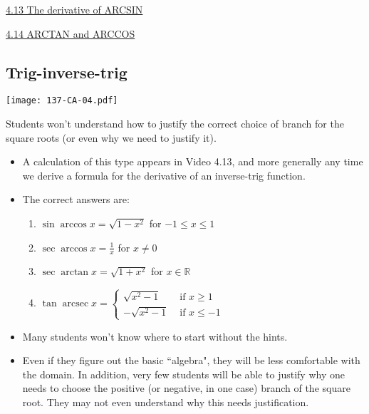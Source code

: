 \documentclass[11pt]{article}
\newcommand {\DS} [1] {${\displaystyle #1}$}
\newcommand{\R}{\mathbb{R}}
\newcommand{\nl}{\hfill \vspace{-1.1\baselineskip}} %
\newcommand{\vxiii}{\hspace{8mm} \href{https://www.youtube.com/watch?v=kuKrSTOKw30&list=PLlwePzQY_wW-EDeUZebRoA8HGoeZxxpEU&index=13}{4.13 The derivative of ARCSIN}}
\newcommand{\vxiv}{\hspace{8mm} \href{https://www.youtube.com/watch?v=kANSILD9sn0&list=PLlwePzQY_wW-EDeUZebRoA8HGoeZxxpEU&index=14}{4.14 ARCTAN and ARCCOS}}
\newcommand{\arcsec}{\operatorname{arcsec}}
\begin{document}
\begin{videos}
\vxiii

\vxiv
\end{videos}

\newpage
\subsection{Trig-inverse-trig}

\begin{center}
{ \texttt{[image: 137-CA-04.pdf]}} 
\end{center}

\begin{warning}
Students won't understand how to justify the correct choice of branch for the square roots (or even why we need to justify it).
\end{warning}
\begin{comments}
\nl
\begin{itemize}
	\item A calculation of this type appears in Video 4.13, and more generally any time we derive a formula for the derivative of an inverse-trig function.
	\item The correct answers are:
		\begin{enumerate}
			\item  \DS{\sin \arccos x = \sqrt{1-x^2}}  for \DS{-1 \leq x \leq 1}
			\item \DS{\sec \arccos x = \frac{1}{x}} for \DS{x \neq 0}
			\item \DS{\sec \arctan x = \sqrt{1+x^2}} for \DS{x \in \R}
			\item \DS{\tan \arcsec x = \begin{cases}
					\sqrt{x^2-1} & \mbox{ if } x \geq 1 \\
					-\sqrt{x^2-1} & \mbox{ if } x \leq -1 
				\end{cases}}
		\end{enumerate}
	\item Many students won't know where to start without the hints.
	
	\item Even if they figure out the basic ``algebra", they will be less comfortable with the domain.  In addition, very few students will be able to justify why one needs to choose the positive (or negative, in one case) branch of the square root.  They may not even understand why this needs justification.
\end{itemize}	
\end{comments}
\end{document}
